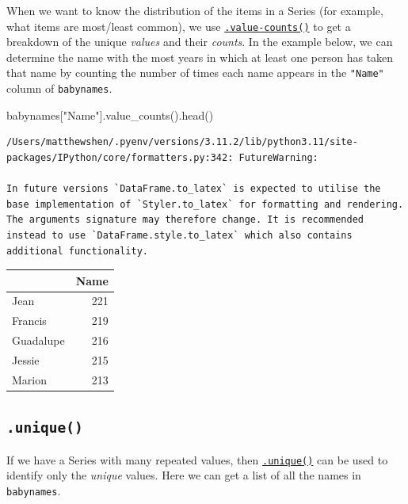 \documentclass[
  letterpaper,
  DIV=11,
  numbers=noendperiod]{scrreprt}
\newenvironment{Shaded}{\begin{snugshade}}{\end{snugshade}}
\newcommand{\NormalTok}[1]{\textcolor[rgb]{0.00,0.23,0.31}{#1}}
\newcommand{\StringTok}[1]{\textcolor[rgb]{0.13,0.47,0.30}{#1}}
\begin{document}
When we want to know the distribution of the items in a Series (for
example, what items are most/least common), we use
\href{https://pandas.pydata.org/docs/reference/api/pandas.Series.value_counts.html}{\texttt{.value-counts()}}
to get a breakdown of the unique \emph{values} and their \emph{counts}.
In the example below, we can determine the name with the most years in
which at least one person has taken that name by counting the number of
times each name appears in the \texttt{"Name"} column of
\texttt{babynames}.

\begin{Shaded}
\begin{Highlighting}[]
\NormalTok{babynames[}\StringTok{"Name"}\NormalTok{].value\_counts().head()}
\end{Highlighting}
\end{Shaded}

\begin{verbatim}
/Users/matthewshen/.pyenv/versions/3.11.2/lib/python3.11/site-packages/IPython/core/formatters.py:342: FutureWarning:

In future versions `DataFrame.to_latex` is expected to utilise the base implementation of `Styler.to_latex` for formatting and rendering. The arguments signature may therefore change. It is recommended instead to use `DataFrame.style.to_latex` which also contains additional functionality.
\end{verbatim}

\begin{tabular}{lr}
\toprule
{} &  Name \\
\midrule
Jean      &   221 \\
Francis   &   219 \\
Guadalupe &   216 \\
Jessie    &   215 \\
Marion    &   213 \\
\bottomrule
\end{tabular}

\hypertarget{unique}{%
\subsection{\texorpdfstring{\texttt{.unique()}}{.unique()}}\label{unique}}

If we have a Series with many repeated values, then
\href{https://pandas.pydata.org/docs/reference/api/pandas.unique.html}{\texttt{.unique()}}
can be used to identify only the \emph{unique} values. Here we can get a
list of all the names in \texttt{babynames}.
\end{document}
